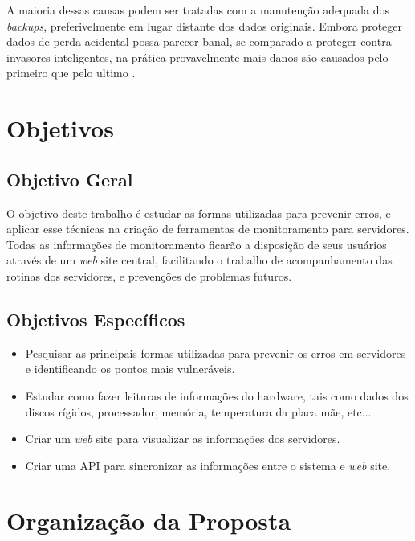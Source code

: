 A maioria dessas causas podem ser tratadas com a manutenção adequada dos \textit{backups}, preferivelmente em lugar distante dos dados originais. Embora proteger dados de perda acidental possa parecer banal, se comparado a proteger contra invasores inteligentes, na prática provavelmente mais danos são causados pelo primeiro que pelo ultimo \cite{Tanenbaum:2003, Silberschatz:2000}.

\section{Objetivos} \label{Sec:Objetivos}

\subsection{Objetivo Geral} \label{Sec:ObjetivoGeral}

O objetivo deste trabalho é estudar as formas utilizadas para prevenir erros, e aplicar esse técnicas na  criação de ferramentas de monitoramento para servidores. Todas as informações de monitoramento ficarão a disposição de seus usuários através de um \textit{web} site central, facilitando o trabalho de acompanhamento das rotinas dos servidores, e prevenções de problemas futuros.


\subsection{Objetivos Específicos}\label{Sec:ObjetivosEspecificos}
\begin{itemize}
	\item Pesquisar as principais formas utilizadas para prevenir os erros em servidores e identificando os pontos mais vulneráveis.
	
	\item Estudar como fazer leituras de informações do hardware,  tais como dados dos discos rígidos, processador, memória, temperatura da placa mãe, etc...
	
	\item	Criar um \textit{web} site para visualizar as informações dos servidores.

	\item Criar uma API para sincronizar as informações entre o sistema e \textit{web} site.
\end{itemize}


\newpage

\section{Organização da Proposta} \label{Sec:Organizacao}

